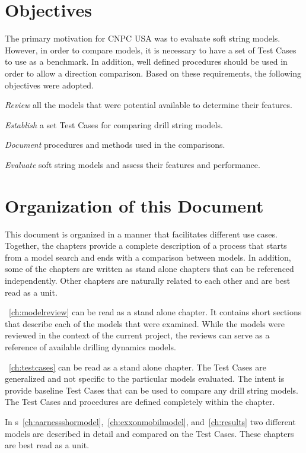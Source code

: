 \section{Objectives}
The primary motivation for CNPC USA was to evaluate soft string models.  However, in order to compare models, it is necessary to have a set of Test Cases to use as a benchmark.  In addition, well defined procedures should be used in order to allow a direction comparison.  Based on these requirements, the following objectives were adopted.
\begin{numberedlist}
	\item \emph{Review} all the models that were potential available to determine their features.
	\item \emph{Establish} a set Test Cases for comparing drill string models.
	\item \emph{Document} procedures and methods used in the comparisons.
	\item \emph{Evaluate} soft string models and assess their features and performance.
\end{numberedlist}

\section{Organization of this Document}
This document is organized in a manner that facilitates different use cases.  Together, the chapters provide a complete description of a process that starts from a model search and ends with a comparison between models.  In addition, some of the chapters are written as stand alone chapters that can be referenced independently.  Other chapters are naturally related to each other and are best read as a unit.

\chaptername~\ref{ch:modelreview} can be read as a stand alone chapter.  It contains short sections that describe each of the models that were examined.  While the models were reviewed in the context of the current project, the reviews can serve as a reference of available drilling dynamics models.

\chaptername~\ref{ch:testcases} can be read as a stand alone chapter.  The Test Cases are generalized and not specific to the particular models evaluated.  The intent is provide baseline Test Cases that can be used to compare any drill string models.  The Test Cases and procedures are defined completely within the chapter.

In \chaptername{}s~\ref{ch:aarnessshormodel},~\ref{ch:exxonmobilmodel}, and~\ref{ch:results} two different models are described in detail and compared on the Test Cases.  These chapters are best read as a unit.

